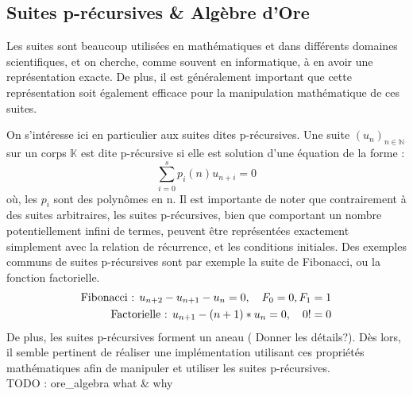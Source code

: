 \documentclass[final,12pt]{article}
\begin{document}
    \subsection{Suites p-récursives \& Algèbre d'Ore}
        \label{ssec:prec}
        \par Les suites sont beaucoup utilisées en mathématiques et dans différents domaines
        scientifiques, et on cherche, comme souvent en informatique, à en avoir une
        représentation exacte. De plus, il est généralement important que cette représentation
        soit également efficace pour la manipulation mathématique de ces suites.
        \par On s'intéresse ici en particulier aux suites dites p-récursives.
        Une suite $(u_n)_{n\in\mathbb N}$ sur un corps $\mathbb K$ est dite p-récursive
        si elle est solution d'une équation de la forme :
        \begin{equation}
            \sum_{i=0}^s p_i(n) u_{n+i} = 0
        \end{equation}
        où, les $p_i$ sont des polynômes en n. Il est importante de noter que contrairement
        à des suites arbitraires, les suites p-récursives, bien que comportant un nombre
        potentiellement infini de termes, peuvent être représentées exactement simplement
        avec la relation de récurrence, et les conditions initiales.
        Des exemples communs de suites p-récursives
        sont par exemple la suite de Fibonacci, ou la fonction factorielle.
        \begin{eqnarray*}
            \textnormal{Fibonacci : } u_{n+2} - u_{n+1} - u_n = 0, \quad F_0=0, F_1=1\\
            \textnormal{Factorielle : } u_{n+1} - (n+1)*u_n = 0, \quad 0!=0
        \end{eqnarray*}
        De plus, les suites p-récursives forment un aneau ({\color{red} Donner les détails?}).
        Dès lors, il semble pertinent
        de réaliser une implémentation utilisant ces propriétés mathématiques afin de
        manipuler et utiliser les suites p-récursives.\\
        {\color{red} TODO : ore\_algebra what \& why}
\end{document}
